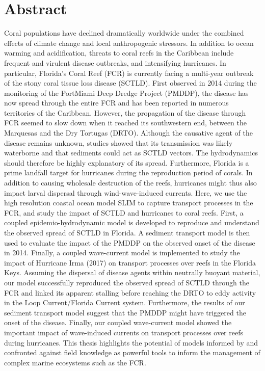 
\chapter*{Abstract}

Coral populations have declined dramatically worldwide under the combined effects of climate change and local anthropogenic stressors. In addition to ocean warming and acidification, threats to coral reefs in the Caribbean include frequent and virulent disease outbreaks, and intensifying hurricanes. In particular, Florida's Coral Reef (FCR) is currently facing a multi-year outbreak of the stony coral tissue loss disease (SCTLD). First observed in 2014 during the monitoring of the PortMiami Deep Dredge Project (PMDDP), the disease has now spread through the entire FCR and has been reported in numerous territories of the Caribbean. However, the propagation of the disease through FCR seemed to slow down when it reached its southwestern end, between the Marquesas and the Dry Tortugas (DRTO). Although the causative agent of the disease remains unknown, studies showed that its transmission was likely waterborne and that sediments could act as SCTLD vectors. The hydrodynamics should therefore be highly explanatory of its spread. Furthermore, Florida is a prime landfall target for hurricanes during the reproduction period of corals. In addition to causing wholesale destruction of the reefs, hurricanes might thus also impact larval dispersal through wind-wave-induced currents. Here, we use the high resolution coastal ocean model SLIM to capture transport processes in the FCR, and study the impact of SCTLD and hurricanes to coral reefs. First, a coupled epidemio-hydrodynamic model is developed to reproduce and understand the observed spread of SCTLD in Florida. A sediment transport model is then used to evaluate the impact of the PMDDP on the observed onset of the disease in 2014. Finally, a coupled wave-current model is implemented to study the impact of Hurricane Irma (2017) on transport processes over reefs in the Florida Keys. Assuming the dispersal of disease agents within neutrally buoyant material, our model successfully reproduced the observed spread of SCTLD through the FCR and linked its apparent stalling before reaching the DRTO to eddy activity in the Loop Current/Florida Current system. Furthermore, the results of our sediment transport model suggest that the PMDDP might have triggered the onset of the disease. Finally, our coupled wave-current model showed the important impact of wave-induced currents on transport processes over reefs during hurricanes. This thesis highlights the potential of models informed by and confronted against field knowledge as powerful tools to inform the management of complex marine ecosystems such as the FCR.

